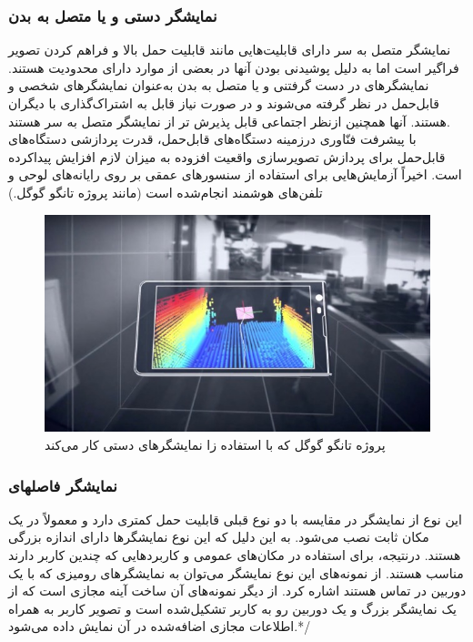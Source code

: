 \subsubsection{نمایشگر دستی و یا متصل به بدن}
نمایشگر متصل به سر دارای قابلیت‌هایی مانند قابلیت حمل بالا و فراهم کردن تصویر فراگیر است اما به دلیل پوشیدنی بودن آنها در بعضی از موارد دارای محدودیت هستند. نمایشگرهای در دست گرفتنی و یا متصل به بدن به‌عنوان نمایشگرهای شخصی و قابل‌حمل در نظر گرفته می‌شوند و در صورت نیاز قابل به اشتراک‌گذاری با دیگران هستند. آنها همچنین ازنظر اجتماعی قابل پذیرش تر از نمایشگر متصل به سر هستند.
\\
با پیشرفت فنّاوری درزمینه دستگاه‌های قابل‌حمل، قدرت پردازشی دستگاه‌های قابل‌حمل برای پردازش تصویرسازی واقعیت افزوده به میزان لازم افزایش پیداکرده است. اخیراً آزمایش‌هایی برای استفاده از سنسورهای عمقی بر روی رایانه‌های لوحی و تلفن‌های هوشمند انجام‌شده است (مانند پروژه تانگو گوگل.) \protect{}

\begin{figure}
	\centering
	\includegraphics[width=1\linewidth]{image/tango}
	\caption {پروژه تانگو گوگل که با استفاده زا نمایشگرهای دستی کار می‌کند}
	\label{fig:tango}
\end{figure}
\subsubsection{نمایشگر فاصلهای}
این نوع از نمایشگر در مقایسه با دو نوع قبلی قابلیت حمل کمتری دارد و معمولاً در یک مکان ثابت نصب می‌شود. به این دلیل که این نوع نمایشگرها دارای اندازه بزرگی هستند. درنتیجه، برای استفاده در مکان‌های عمومی و کاربردهایی که چندین کاربر دارند مناسب هستند. از نمونه‌های این نوع نمایشگر می‌توان به نمایشگرهای رومیزی که با یک دوربین در تماس هستند اشاره کرد. از دیگر نمونه‌های آن ساخت آینه مجازی است که از یک نمایشگر بزرگ و یک دوربین رو به کاربر تشکیل‌شده است و تصویر کاربر به همراه اطلاعات مجازی اضافه‌شده در آن نمایش داده می‌شود\cite{Billinghurst}.*/



